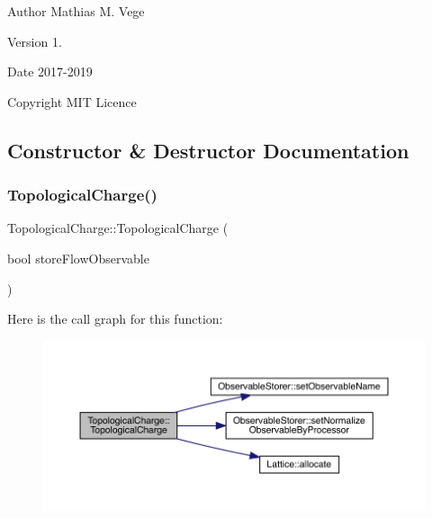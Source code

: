 \begin{DoxyAuthor}{Author}
Mathias M. Vege 
\end{DoxyAuthor}
\begin{DoxyVersion}{Version}
1. 
\end{DoxyVersion}
\begin{DoxyDate}{Date}
2017-\/2019 
\end{DoxyDate}
\begin{DoxyCopyright}{Copyright}
M\+IT Licence 
\end{DoxyCopyright}


\subsection{Constructor \& Destructor Documentation}
\mbox{\label{class_topological_charge_a415e32f865f7b5c83f4ac4471838d514}} 
\subsubsection{\texorpdfstring{TopologicalCharge()}{TopologicalCharge()}}
{\footnotesize\ttfamily Topological\+Charge\+::\+Topological\+Charge (\begin{DoxyParamCaption}\item[{bool}]{store\+Flow\+Observable }\end{DoxyParamCaption})}

Here is the call graph for this function\+:\nopagebreak
\begin{figure}[H]
\begin{center}
\leavevmode
\includegraphics[width=350pt]{class_topological_charge_a415e32f865f7b5c83f4ac4471838d514_cgraph}
\end{center}
\end{figure}
\mbox{\label{class_topological_charge_aec647c5c45f8532639cebcac10865f2e}} 

